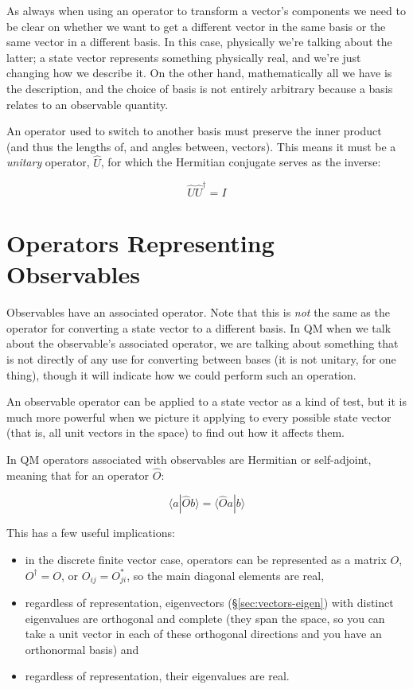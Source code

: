 As always when using an operator to transform a vector's components we need to be clear on whether we want to get a different vector in the same basis or the same vector in a different basis. In this case, physically we're talking about the latter; a state vector represents something physically real, and we're just changing how we describe it. On the other hand, mathematically all we have is the description, and the choice of basis is not entirely arbitrary because a basis relates to an observable quantity.

An operator used to switch to another basis must preserve the inner product (and thus the lengths of, and angles between, vectors). This means it must be a \textit{unitary} operator, $\hat{U}$, for which the Hermitian conjugate serves as the inverse:

$$\hat{U} \hat{U}^\dagger = I$$

\section{Operators Representing Observables} \label{sec:qm-operators1}

Observables have an associated operator. Note that this is \textit{not} the same as the operator for converting a state vector to a different basis. In QM when we talk about the observable's associated operator, we are talking about something that is not directly of any use for converting between bases (it is not unitary, for one thing), though it will indicate how we could perform such an operation.

An observable operator can be applied to a state vector as a kind of test, but it is much more powerful when we picture it applying to every possible state vector (that is, all unit vectors in the space) to find out how it affects them.

In QM operators associated with observables are Hermitian or self-adjoint, meaning that for an operator $\hat{O}$:

$$\langle a|\hat{O} b \rangle = \langle \hat{O} a| b \rangle$$

This has a few useful implications:

\begin{itemize}
  \item in the discrete finite vector case, operators can be represented as a matrix $O$, $O^{\dagger} = O$, or $O_{ij} = O_{ji}^*$, so the main diagonal elements are real,
  \item regardless of representation, eigenvectors (§\ref{sec:vectors-eigen}) with distinct eigenvalues are orthogonal and complete (they span the space, so you can take a unit vector in each of these orthogonal directions and you have an orthonormal basis) and
  \item regardless of representation, their eigenvalues are real.
\end{itemize}


